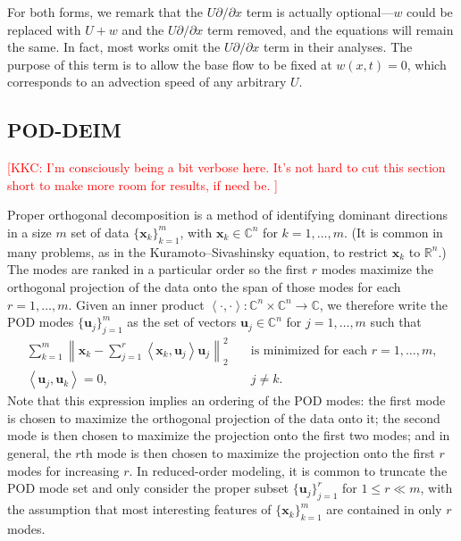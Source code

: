 \documentclass[11pt]{article}
\newcommand*{\Complex}{\mathbb{C}}
\newcommand*{\Reals}{\mathbb{R}}
\newcommand*{\ip}[2]{\left<#1, #2\right>}
\renewcommand*{\u}{\mathbf{u}}
\newcommand*{\x}{\mathbf{x}}
\newcommand{\KSE}{Kuramoto--Sivashinsky equation}
\newcommand{\kkc}[1]{\textcolor{red}{[KKC: #1]}}
\begin{document}
For both forms, we remark that the $U \partial / \partial x$ term is actually optional---$w$ could be replaced with $U + w$ and the $U \partial / \partial x$ term removed, and the equations will remain the same.
In fact, most works omit the $U \partial / \partial x$ term in their analyses.
The purpose of this term is to allow the base flow to be fixed at $w(x, t) = 0$, which corresponds to an advection speed of any arbitrary $U$.

\subsection{POD-DEIM}

\kkc{%
    I'm consciously being a bit verbose here.
    It's not hard to cut this section short to make more room for results, if need be.%
}

Proper orthogonal decomposition \citep{SirovichQAM87, HolmesTCSDSS} is a method of identifying dominant directions in a size $m$ set of data $\{\x_k\}_{k=1}^m$, with $\x_k \in \Complex^n$ for $k = 1, \ldots, m$.
(It is common in many problems, as in the \KSE, to restrict $\x_k$ to $\Reals^n$.)
The modes are ranked in a particular order so the first $r$ modes maximize the orthogonal projection of the data onto the span of those modes for each $r = 1, \ldots, m$.
Given an inner product $\ip{\cdot}{\cdot} : \Complex^n \times \Complex^n \to \Complex$, we therefore write the POD modes $\{\u_j\}_{j=1}^m$ as the set of vectors $\u_j \in \Complex^n$ for $j = 1, \ldots, m$ such that
\begin{subequations}
    \begin{align}
        \sum_{k=1}^m \left\|\x_k - \sum_{j=1}^r \ip{\x_k}{\u_j} \u_j \right\|_2^2 \quad & \text{is minimized for each } r = 1, \ldots, m, \\
        \ip{\u_j}{\u_k} = 0, \quad & j \ne k.
    \end{align}
\end{subequations}
Note that this expression implies an ordering of the POD modes: the first mode is chosen to maximize the orthogonal projection of the data onto it; the second mode is then chosen to maximize the projection onto the first two modes; and in general, the $r$th mode is then chosen to maximize the projection onto the first $r$ modes for increasing $r$.
In reduced-order modeling, it is common to truncate the POD mode set and only consider the proper subset $\{\u_j\}_{j=1}^r$ for $1 \le r \ll m$, with the assumption that most interesting features of $\{\x_k\}_{k=1}^m$ are contained in only $r$ modes.
\end{document}
